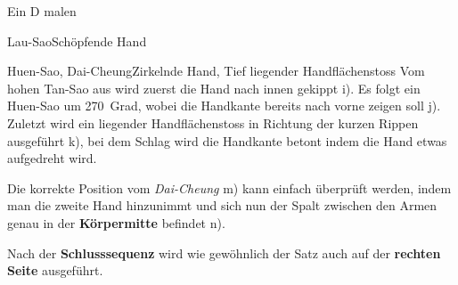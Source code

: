 \begin{WTSatz}{Ein D malen}
\begin{WTSatzTeil}{Lau-Sao}{Sch\"opfende Hand}
		
	\end{WTSatzTeil}
	\begin{WTSatzTeil}{Huen-Sao, Dai-Cheung}{Zirkelnde Hand, Tief liegender Handfl\"achenstoss}
		Vom hohen Tan-Sao aus wird zuerst die Hand nach innen gekippt i). Es folgt ein Huen-Sao um 270~Grad, wobei die Handkante bereits nach vorne zeigen soll j). Zuletzt wird ein liegender Handfl\"achenstoss in Richtung der kurzen Rippen ausgef\"uhrt k), bei dem Schlag wird die Handkante betont indem die Hand etwas aufgedreht wird.
		
		\begin{WTCommonNoob}
			
			Die korrekte Position vom \textit{Dai-Cheung} m) kann einfach \"uberpr\"uft werden, indem man die zweite Hand hinzunimmt und sich nun der Spalt zwischen den Armen genau in der \textbf{K\"orpermitte} befindet n).
		\end{WTCommonNoob}
		
		
		Nach der \textbf{Schlusssequenz} wird wie gew\"ohnlich der Satz auch auf der \textbf{rechten Seite} ausgef\"uhrt.
		
	\end{WTSatzTeil}
\end{WTSatz}




